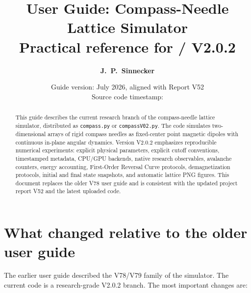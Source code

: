 \documentclass[11pt,a4paper]{article}
\title{\textbf{User Guide: Compass-Needle Lattice Simulator}\\[1ex]
\large Practical reference for \code{compass.py} / \code{compassV02.py} V2.0.2}
\author{\textbf{J.~P.~Sinnecker}}
\date{Guide version: July 2026, aligned with Report V52\\
Source code timestamp: \code{2026-07-10T11:50:24-03:00}}
\newcommand{\code}[1]{\texttt{#1}}
\begin{document}
\maketitle

\begin{abstract}
\noindent
This guide describes the current research branch of the compass-needle lattice simulator, distributed as \code{compass.py} or \code{compassV02.py}. The code simulates two-dimensional arrays of rigid compass needles as fixed-center point magnetic dipoles with continuous in-plane angular dynamics. Version V2.0.2 emphasizes reproducible numerical experiments: explicit physical parameters, explicit cutoff conventions, timestamped metadata, CPU/GPU backends, native research observables, avalanche counters, energy accounting, First-Order Reversal Curve protocols, demagnetization protocols, initial and final state snapshots, and automatic lattice PNG figures. This document replaces the older V78 user guide and is consistent with the updated project report V52 and the latest uploaded code.
\end{abstract}

\tableofcontents
\newpage

\section{What changed relative to the older user guide}
\label{sec:changes}

The earlier user guide described the V78/V79 family of the simulator. The current code is a research-grade V2.0.2 branch. The most important changes are:
\end{document}
